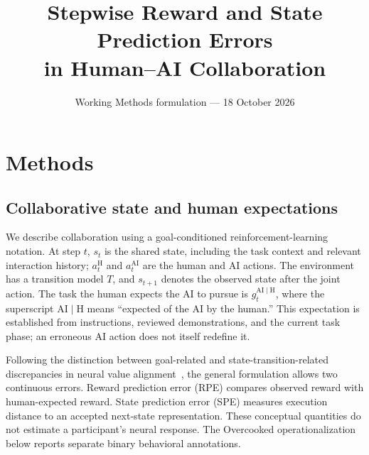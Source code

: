 \documentclass[11pt]{article}
\title{Stepwise Reward and State Prediction Errors\\in Human--AI Collaboration}
\author{}
\date{Working Methods formulation --- 18 October 2026}
\newcommand{\AIH}{\mathrm{AI}\mid\mathrm{H}}
\newcommand{\gt}{g_t^{\AIH}}
\begin{document}
\maketitle

\section{Methods}
\label{sec:methods}

\subsection{Collaborative state and human expectations}
We describe collaboration using a goal-conditioned reinforcement-learning
notation. At step $t$, $s_t$ is the shared state, including the task context and
relevant interaction history; $a_t^{\mathrm H}$ and $a_t^{\mathrm{AI}}$ are the
human and AI actions. The environment has a transition model $T$, and
$s_{t+1}$ denotes the observed state after the joint action. The task the human
expects the AI to pursue is $\gt$, where the superscript $\AIH$ means
``expected of the AI by the human.'' This expectation is established from
instructions, reviewed demonstrations, and the current task phase; an
erroneous AI action does not itself redefine it.

Following the distinction between goal-related and state-transition-related
discrepancies in neural value alignment~\cite{xu2026nva}, the general
formulation allows two continuous errors. Reward prediction error (RPE)
compares observed reward with human-expected reward. State prediction error
(SPE) measures execution distance to an accepted next-state representation.
These conceptual quantities do not estimate a participant's neural response.
The Overcooked operationalization below reports separate binary behavioral
annotations.
\end{document}
